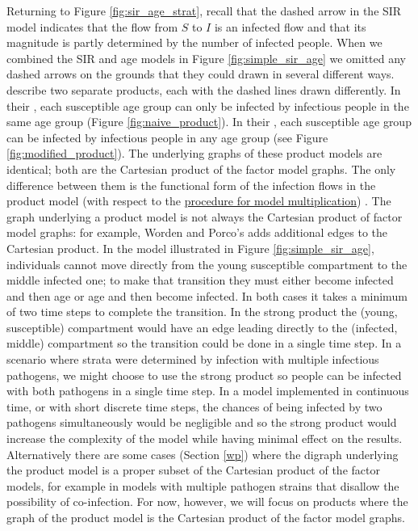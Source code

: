 Returning to Figure \ref{fig:sir_age_strat}, recall that the dashed arrow in the SIR model indicates that the flow from $S$ to $I$ is an infected flow and that its magnitude is partly determined by the number of infected people. When we combined the SIR and age models in Figure \ref{fig:simple_sir_age} we omitted any dashed arrows on the grounds that they could drawn in several different ways. \cite{worden2017products} describe two separate products, each with the dashed lines drawn differently. In their , each susceptible age group can only be infected by infectious people in the same age group (Figure \ref{fig:naive_product}). In their , each susceptible age group can be infected by infectious people in any age group (see Figure \ref{fig:modified_product}). The underlying graphs of these product models are identical; both are the Cartesian product of the factor model graphs. The only difference between them is the functional form of the infection flows in the product model (with respect to the \hyperref[genproc]{procedure for model multiplication}) . The graph underlying a product model is not always the Cartesian product of factor model graphs: for example, Worden and Porco's  adds additional edges to the Cartesian product. In the model illustrated in Figure \ref{fig:simple_sir_age}, individuals cannot move directly from the young susceptible compartment to the middle infected one; to make that transition they must either become infected and then age or age and then become infected. In both cases it takes a minimum of two time steps to complete the transition. In the strong product the (young, susceptible) compartment would have an edge leading directly to the (infected,  middle) compartment so the transition could be done in a single time step. In a scenario where strata were determined by infection with multiple infectious pathogens, we might choose to use the strong product so people can be infected with both pathogens in a single time step. In a model implemented in continuous time, or with short discrete time steps, the chances of being infected by two pathogens simultaneously would be negligible and so the strong product would increase the complexity of the model while having minimal effect on the results. Alternatively there are some cases (Section \ref{wp}) where the digraph underlying the product model is a proper subset of the Cartesian product of the factor models, for example in models with multiple pathogen strains that disallow the possibility of co-infection. For now, however, we will focus on products where the graph of the product model is the Cartesian product of the factor model graphs.

